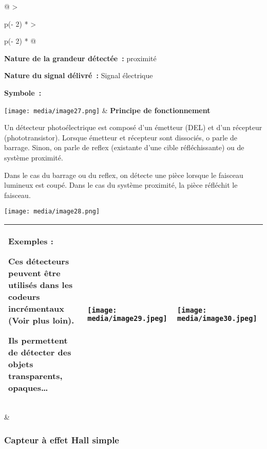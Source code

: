 \documentclass[
]{article}
\begin{document}
\begin{longtable}[]{@{}
  >{\raggedright\arraybackslash}p{(\columnwidth - 2\tabcolsep) * }
  >{\raggedright\arraybackslash}p{(\columnwidth - 2\tabcolsep) * }@{}}
\toprule
\textbf{Nature de la grandeur détectée~:} proximité

\textbf{Nature du signal délivré~:} Signal électrique

\textbf{Symbole~:}

\texttt{[image: media/image27.png]} &
\textbf{Principe de fonctionnement}

Un détecteur photoélectrique est composé d'un émetteur (DEL) et d'un
récepteur (phototransistor). Lorsque émetteur et récepteur sont
dissociés, o parle de barrage. Sinon, on parle de reflex (existante
d'une cible réfléchissante) ou de système proximité.

Dans le cas du barrage ou du reflex, on détecte une pièce lorsque le
faisceau lumineux est coupé. Dans le cas du système proximité, la pièce
réfléchit le faisceau.

\texttt{[image: media/image28.png]} \\
\midrule
\endhead
\begin{minipage}[t]{\linewidth}\raggedright
\begin{longtable}[]{@{}
  >{\raggedright\arraybackslash}p{}
  >{\raggedright\arraybackslash}p{}
  >{\raggedright\arraybackslash}p{}@{}}
\toprule
\endhead
\textbf{Exemples :}

Ces détecteurs peuvent être utilisés dans les codeurs incrémentaux (Voir
plus loin).

Ils permettent de détecter des objets transparents, opaques\ldots{} &
\texttt{[image: media/image29.jpeg]} &
\texttt{[image: media/image30.jpeg]} \\
\bottomrule
\end{longtable}
\end{minipage} & \\
\bottomrule
\end{longtable}

\hypertarget{capteur-uxe0-effet-hall-simple}{%
\subsubsection{Capteur à effet Hall
simple}\label{capteur-uxe0-effet-hall-simple}}
\end{document}
